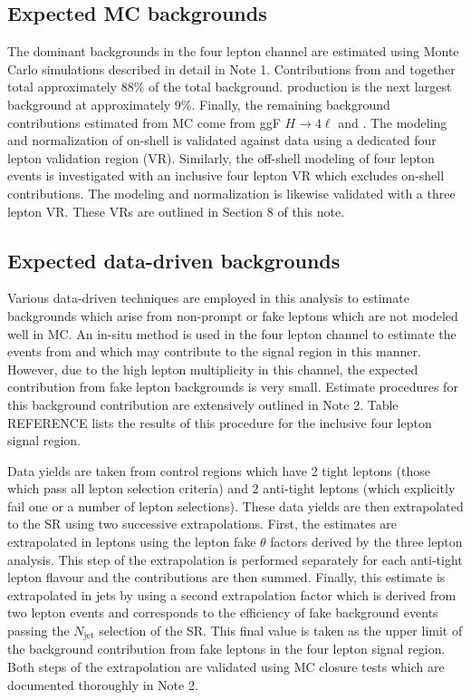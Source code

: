 \subsection{Expected MC backgrounds}
The dominant backgrounds in the four lepton channel are estimated using Monte Carlo simulations described in detail in Note 1. 
Contributions from \ttZ and \tZ together total approximately 88\% of the total background. 
\ZZ production is the next largest background at approximately 9\%.
Finally, the remaining background contributions estimated from MC come from ggF $H\to4\ell$ and \ttWW.  
The modeling and normalization of on-shell \ZZ is validated against data using a dedicated four lepton validation region (VR). 
Similarly, the off-shell modeling of four lepton events is investigated with an inclusive four lepton VR which excludes on-shell \ZZ contributions.
The \ttZ modeling and normalization is likewise validated with a three lepton VR. 
These VRs are outlined in Section 8 of this note.
 
\subsection{Expected data-driven backgrounds}
Various data-driven techniques are employed in this analysis to estimate backgrounds which arise from non-prompt or fake leptons which are not modeled well in MC.
An in-situ method is used in the four lepton channel to estimate the events from \ttbar and \zj which may contribute to the signal region in this manner. 
However, due to the high lepton multiplicity in this channel, the expected contribution from fake lepton backgrounds is very small. 
Estimate procedures for this background contribution are extensively outlined in Note 2. 
Table REFERENCE lists the results of this procedure for the inclusive four lepton signal region. 


Data yields are taken from control regions which have 2 tight leptons (those which pass all lepton selection criteria) and 2 anti-tight leptons (which explicitly fail one or a number of lepton selections). 
These data yields are then extrapolated to the SR using two successive extrapolations. 
First, the estimates are extrapolated in leptons using the lepton fake $\theta$ factors derived by the three lepton analysis. 
This step of the extrapolation is performed separately for each anti-tight lepton flavour and the contributions are then summed. 
Finally, this estimate is extrapolated in jets by using a second extrapolation factor which is derived from two lepton events and corresponds to the efficiency of fake background events passing the $N_{\mathrm{jet}}$ selection of the SR. 
This final value is taken as the upper limit of the background contribution from fake leptons in the four lepton signal region. 
Both steps of the extrapolation are validated using MC closure tests which are documented thoroughly in Note 2. 

